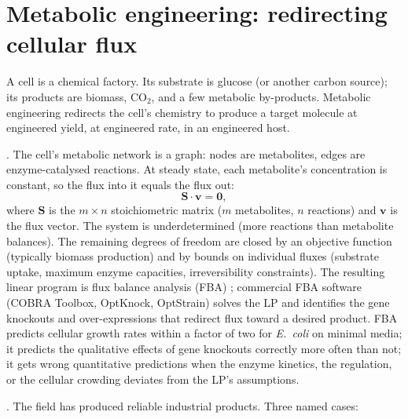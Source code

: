 \section{Metabolic engineering: redirecting cellular flux}

A cell is a chemical factory. Its substrate is glucose (or another
carbon source); its products are biomass, CO$_2$, and a few
metabolic by-products. Metabolic engineering redirects the cell's
chemistry to produce a target molecule at engineered yield, at
engineered rate, in an engineered host.

. The cell's metabolic network is a
graph: nodes are metabolites, edges are enzyme-catalysed reactions.
At steady state, each metabolite's concentration is constant, so
the flux into it equals the flux out:
\[
\mathbf{S} \cdot \mathbf{v} = \mathbf{0},
\]
where $\mathbf{S}$ is the $m \times n$ stoichiometric matrix
($m$ metabolites, $n$ reactions) and $\mathbf{v}$ is the flux
vector. The system is underdetermined (more reactions than
metabolite balances). The remaining degrees of freedom are closed
by an objective function (typically biomass production) and by
bounds on individual fluxes (substrate uptake, maximum enzyme
capacities, irreversibility constraints). The resulting linear
program is flux balance analysis (FBA)
\cite[chs.~3--4]{text:v6c09-palsson-systems-biology-2015}; commercial FBA
software (COBRA Toolbox, OptKnock, OptStrain) solves the LP and
identifies the gene knockouts and over-expressions that redirect
flux toward a desired product. FBA predicts cellular growth rates
within a factor of two for \emph{E.\ coli} on minimal media; it
predicts the qualitative effects of gene knockouts correctly more
often than not; it gets wrong quantitative predictions when the
enzyme kinetics, the regulation, or the cellular crowding deviates
from the LP's assumptions.

. The field
has produced reliable industrial products. Three named cases:

